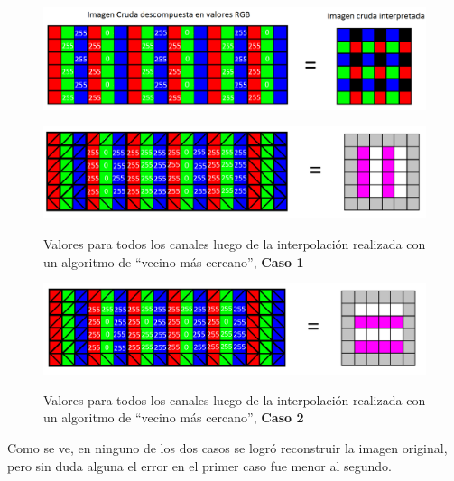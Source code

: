 \documentclass[a4paper]{article}
\begin{document}
\begin{figure}[h!]
    \caption{}
    \begin{center}
    \includegraphics[scale=0.35]{imagenes/apxlvecino1}
    \label{apxlvecino1}
  \end{center}
\end{figure}


\begin{figure}[h!]
    \caption{Valores para todos los canales luego de la interpolación realizada con un algoritmo de ``vecino más cercano'', \textbf{Caso 1}}
    \begin{center}
    \includegraphics[scale=0.35]{imagenes/apxlvecino2}
    \label{apxlvecino2}
  \end{center}
\end{figure}

\begin{figure}[h!]
    \caption{ Valores para todos los canales luego de la interpolación realizada con un algoritmo de ``vecino más cercano'', \textbf{Caso 2}}
    \begin{center}
    \includegraphics[scale=0.35]{imagenes/apxlvecinoOTRO2}
    \label{apxlvecinoOTRO2}
  \end{center}
\end{figure}


\newpage

Como se ve, en ninguno de los dos casos se logró reconstruir la imagen original, pero sin duda alguna el error en el primer caso fue menor al segundo.\\
\end{document}
